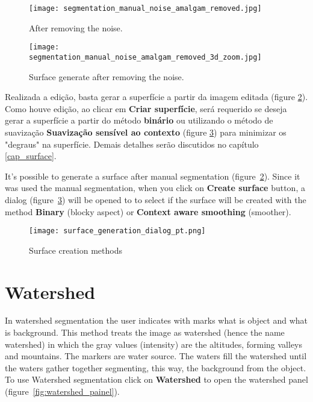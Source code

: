 \begin{figure}[!htb]
\centering
\texttt{[image: segmentation\_manual\_noise\_amalgam\_removed.jpg]}
\caption{After removing the noise.}
\label{fig:editor_amalgaman}
\end{figure}

\begin{figure}[!htb]
\centering
\texttt{[image: segmentation\_manual\_noise\_amalgam\_removed\_3d\_zoom.jpg]}
\caption{Surface generate after removing the noise.}
\label{fig:surface_edited_amalgaman}
\end{figure}

Realizada a edição, basta gerar a superfície a partir da imagem editada (figure \ref{fig:surface_edited_amalgaman}). Como houve edição, ao clicar em \textbf{Criar superfície}, será requerido se deseja gerar a superfície a partir do método \textbf{binário} ou utilizando o método de suavização \textbf{Suavização sensível ao contexto} (figure \ref{fig:new_surface_edited}) para minimizar os "degraus" na superfície.  Demais detalhes serão discutidos no capítulo \ref{cap_surface}.

It's possible to generate a surface after manual segmentation (figure~\ref{fig:surface_edited_amalgaman}). Since it was used the manual segmentation, when you click on \textbf{Create surface} button, a dialog (figure~\ref{fig:new_surface_edited}) will be opened to  to select if the surface will be created with the method \textbf{Binary} (blocky aspect) or \textbf{Context aware smoothing} (smoother).


\begin{figure}[!htb]
\centering
\texttt{[image: surface\_generation\_dialog\_pt.png]}
\caption{Surface creation methods}
\label{fig:new_surface_edited}
\end{figure}


\section{Watershed}

In watershed segmentation the user indicates with marks what is object and what is background. This method treats the image as watershed (hence the name watershed) in which the gray values (intensity) are the altitudes, forming valleys and mountains. The markers are water source. The waters fill the watershed until the waters gather together segmenting, this way, the background from the object. To use Watershed segmentation click on \textbf{Watershed} to open the watershed panel (figure~\ref{fig:watershed_painel}).

